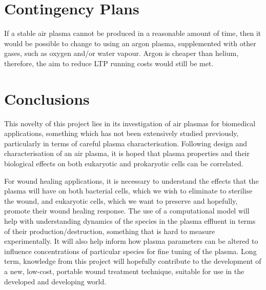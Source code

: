 \documentclass[11pt, oneside]{article}   	%
\begin{document}
\section*{Contingency Plans}

If a stable air plasma cannot be produced in a reasonable amount of time, then it would be possible to change to using an argon plasma, supplemented with other gases, such as oxygen and/or water vapour.
Argon is cheaper than helium, therefore, the aim to reduce LTP running costs would still be met.

\section*{Conclusions}
This novelty of this project lies in its investigation of air plasmas for biomedical applications, something which has not been extensively studied previously, particularly in terms of careful plasma characterisation.
Following design and characterisation of an air plasma, it is hoped that plasma properties and their biological effects on both eukaryotic and prokaryotic cells can be correlated. 

For wound healing applications, it is necessary to understand the effects that the plasma will have on both bacterial cells, which we wish to eliminate to sterilise the wound, and eukaryotic cells, which we want to preserve and hopefully, promote their wound healing response. 
The use of a computational model will help with understanding dynamics of the species in the plasma effluent in terms of their production/destruction, something that is hard to measure experimentally. It will also help inform how plasma parameters can be altered to influence concentrations of particular species for fine tuning of the plasma.
Long term, knowledge from this project will hopefully contribute to the development of a new, low-cost, portable wound treatment technique, suitable for use in the developed and developing world.




%

\end{document}
